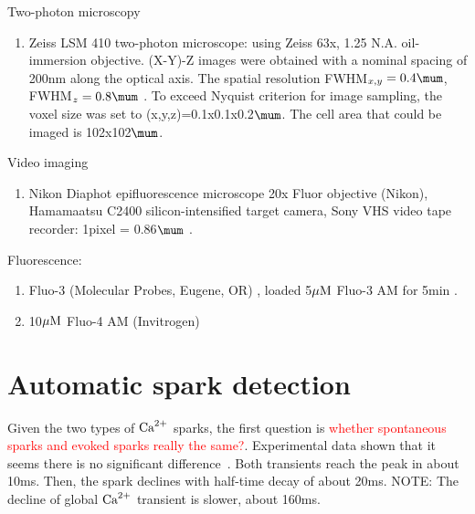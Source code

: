 Two-photon microscopy
\begin{enumerate}
  \item   Zeiss LSM 410 two-photon microscope: using Zeiss 63x, 1.25 N.A.
  oil-immersion objective. (X-Y)-Z images were obtained with a nominal spacing
  of 200nm along the optical axis. The spatial resolution FWHM$_{x,y}=0.4\mum$,
  FWHM$_z=0.8\mum$ \citep{soeller1999}. To exceed Nyquist criterion for image
  sampling, the voxel size was set to (x,y,z)=0.1x0.1x0.2$\mum$. The cell area
  that could be imaged is 102x102$\mum$.
  
\end{enumerate}

Video imaging
\begin{enumerate}
    \item Nikon Diaphot epifluorescence microscope 20x Fluor objective (Nikon),
  Hamamaatsu C2400 silicon-intensified target camera, Sony VHS video tape
  recorder: 1pixel = 0.86$\mum$ \citep{wang1993lpf}. 
    
\end{enumerate}

Fluorescence:
\begin{enumerate}
  \item Fluo-3 (Molecular Probes, Eugene, OR) \citep{cheng1999}, loaded 5${\mu\text{M}}$
  Fluo-3 AM for 5min \citep{walden2009}.
  \item 10${\mu\text{M}}$ Fluo-4 AM (Invitrogen) \citep{picht2007}
\end{enumerate}

\section{Automatic spark detection}
\label{sec:spark-detection}

Given the two types of ${\text{Ca}^{2+}}$ sparks, the first question is
\textcolor{red}{whether spontaneous sparks and evoked sparks really
  the same?}. Experimental data shown that it seems there is no significant
difference~\citep{cannell1995b,lopez-lopez1995}. Both transients reach the peak
in about 10ms. Then, the spark declines with half-time decay of about 20ms.
NOTE: The decline of global ${\text{Ca}^{2+}}$ transient is slower, about 160ms.



